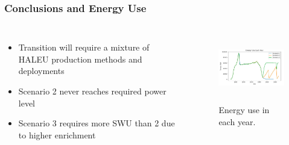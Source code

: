 \begin{frame}
        \frametitle{Conclusions and Energy Use}
              \begin{columns}
                      \column[t]{5cm}
                        \begin{itemize}
                                \item Transition will require a mixture of HALEU production methods and deployments
                                \item Scenario 2 never reaches required power level
                                \item Scenario 3 requires more SWU than 2 due to higher enrichment
                        \end{itemize}
                      \column[t]{5cm}
              \begin{figure}[htbp!]
              \begin{center}
            \includegraphics[height=3cm]{./images/e_use.png}
          \end{center}
                \caption{Energy use in each year. \cite{bachmann}}
          \label{fig:e_use}
        \end{figure}
              \end{columns}
\end{frame}
